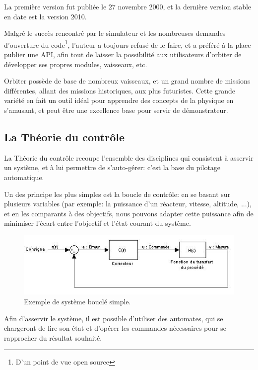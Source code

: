 \documentclass[a4paper,11pt]{article}
\begin{document}
        La première version fut publiée le 27 novembre 2000, et la dernière version stable en date est la version 2010.

        Malgré le succès rencontré par le simulateur et les nombreuses demandes d'ouverture du code\footnote{D'un point de vue open source}, l'auteur a toujours refusé de le faire, et a préféré à la place publier une API, afin tout de laisser la possibilité aux utilisateurs d'orbiter de développer ses propres modules, vaisseaux, etc.

        Orbiter possède de base de nombreux vaisseaux, et un grand nombre de missions différentes, allant des missions historiques, aux plus futuristes. Cette grande variété en fait un outil idéal pour apprendre des concepts de la physique en s'amusant, et peut être une excellence base pour servir de démonstrateur.

    \subsection{La Théorie du contrôle}
        La Théorie du contrôle recoupe l'ensemble des disciplines qui consistent à asservir un système, et à lui permettre de s'auto-gérer: c'est la base du pilotage automatique.

        Un des principe les plus simples est la boucle de contrôle: en se basant sur plusieurs variables (par exemple: la puissance d'un réacteur, vitesse, altitude, ...), et en les comparants à des objectifs, nous pouvons adapter cette puissance afin de minimiser l'écart entre l'objectif et l'état courant du système.

        \begin{figure}[!h]
            \begin{center}
                \includegraphics[width=1\textwidth]{img/boucle_controle.jpg}
                \caption{Exemple de système bouclé simple.}
            \end{center}
        \end{figure}
        
        Afin d'asservir le système, il est possible d'utiliser des automates, qui se chargeront de lire son état et d'opérer les commandes nécessaires pour se rapprocher du résultat souhaité.
\end{document}
